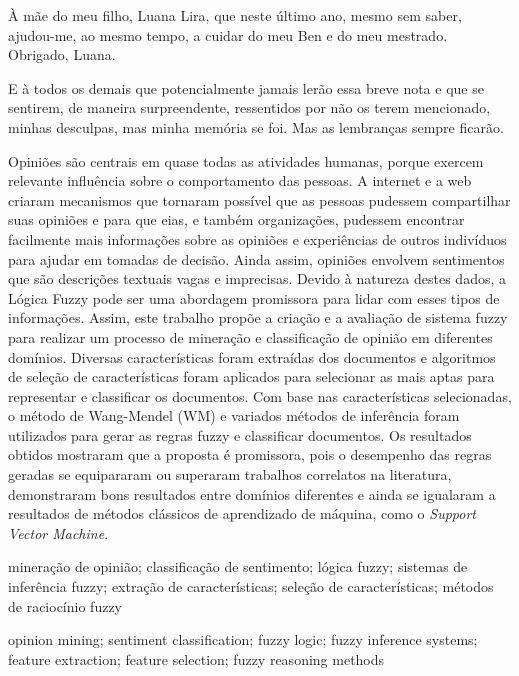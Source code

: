 \documentclass[msc, a4paper, classic, pt]{ufbathesis}
\begin{document}
À mãe do meu filho, Luana Lira, que neste último ano, mesmo sem saber, ajudou-me, ao mesmo tempo, a cuidar do meu Ben e do meu mestrado. Obrigado, Luana.

E à todos os demais que potencialmente jamais lerão essa breve nota e que se sentirem, de maneira surpreendente, ressentidos por não os terem mencionado, minhas desculpas, mas minha memória se foi. Mas as lembranças sempre ficarão.

\resumo
Opiniões são centrais em quase todas as atividades humanas, porque exercem relevante influência sobre o comportamento das pessoas. A internet e a web criaram mecanismos que tornaram possível que as pessoas pudessem compartilhar suas opiniões e para que eias, e também organizações, pudessem encontrar facilmente mais informações sobre as opiniões e experiências de outros indivíduos para ajudar em tomadas de decisão. Ainda assim, opiniões envolvem sentimentos que são descrições textuais vagas e imprecisas. Devido à natureza destes dados, a Lógica Fuzzy pode ser uma abordagem promissora para lidar com esses tipos de informações. Assim, este trabalho propõe a criação e a avaliação de sistema fuzzy para realizar um processo de mineração e classificação de opinião em diferentes domínios. Diversas características foram extraídas dos documentos e algoritmos de seleção de características foram aplicados para selecionar as mais aptas para representar e classificar os documentos. Com base nas características selecionadas, o método de Wang-Mendel (WM) e variados métodos de inferência foram utilizados para gerar as regras fuzzy e classificar documentos. Os resultados obtidos mostraram que a proposta é promissora, pois o desempenho das regras geradas se equipararam ou superaram trabalhos correlatos na literatura, demonstraram bons resultados entre domínios diferentes e ainda se igualaram a resultados de métodos clássicos de aprendizado de máquina, como o \textit{Support Vector Machine}.
\begin{keywords}
mineração de opinião; classificação de sentimento; lógica fuzzy; sistemas de inferência fuzzy; extração de características; seleção de características; métodos de raciocínio fuzzy
\end{keywords}

\abstract
\begin{keywords}
opinion mining; sentiment classification; fuzzy logic; fuzzy inference systems; feature extraction; feature selection; fuzzy reasoning methods
\end{keywords}
\end{document}
